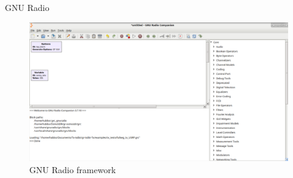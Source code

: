 \begin{frame}{GNU Radio}
	\begin{figure}
	\includegraphics[scale=0.22]{grc}
	\caption{GNU Radio framework}
	\end{figure}
\end{frame}

